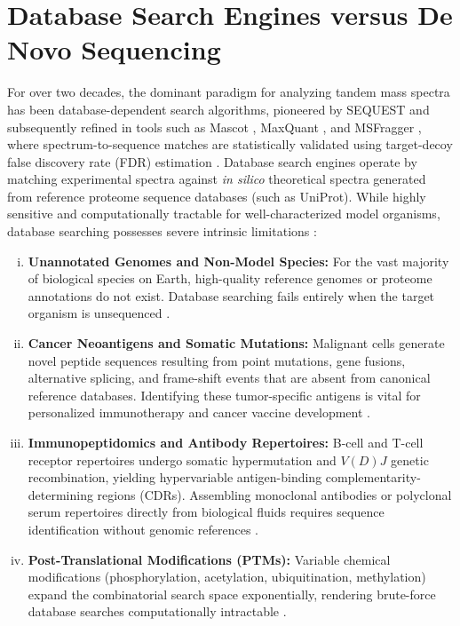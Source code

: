 \section{Database Search Engines versus De Novo Sequencing}

For over two decades, the dominant paradigm for analyzing tandem mass spectra has been database-dependent search algorithms, pioneered by SEQUEST \citep{Eng1994} and subsequently refined in tools such as Mascot \citep{Perkins1999}, MaxQuant \citep{Cox2008}, and MSFragger \citep{Kong2017}, where spectrum-to-sequence matches are statistically validated using target-decoy false discovery rate (FDR) estimation \citep{Elias2007}. Database search engines operate by matching experimental spectra against \emph{in silico} theoretical spectra generated from reference proteome sequence databases (such as UniProt). While highly sensitive and computationally tractable for well-characterized model organisms, database searching possesses severe intrinsic limitations \citep{Nesvizhskii2014}:

\begin{enumerate}[(i)]
\item \textbf{Unannotated Genomes and Non-Model Species:} For the vast majority of biological species on Earth, high-quality reference genomes or proteome annotations do not exist. Database searching fails entirely when the target organism is unsequenced \citep{Nesvizhskii2014, Aebersold2016}.
\item \textbf{Cancer Neoantigens and Somatic Mutations:} Malignant cells generate novel peptide sequences resulting from point mutations, gene fusions, alternative splicing, and frame-shift events that are absent from canonical reference databases. Identifying these tumor-specific antigens is vital for personalized immunotherapy and cancer vaccine development \citep{Schumacher2015, BassaniSternberg2016}.
\item \textbf{Immunopeptidomics and Antibody Repertoires:} B-cell and T-cell receptor repertoires undergo somatic hypermutation and $V(D)J$ genetic recombination, yielding hypervariable antigen-binding complementarity-determining regions (CDRs). Assembling monoclonal antibodies or polyclonal serum repertoires directly from biological fluids requires sequence identification without genomic references \citep{Purcell2019, Bonissone2016}.
\item \textbf{Post-Translational Modifications (PTMs):} Variable chemical modifications (phosphorylation, acetylation, ubiquitination, methylation) expand the combinatorial search space exponentially, rendering brute-force database searches computationally intractable \citep{Chick2015, Kong2017}.
\end{enumerate}


